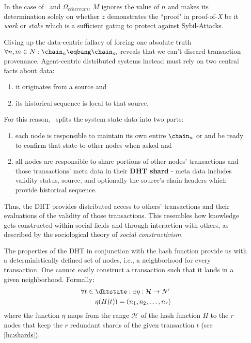 \documentclass[twocolumn,showpacs,%
  nofootinbib,aps,superscriptaddress,%
  eqsecnum,prd,notitlepage,showkeys,10pt]{revtex4-1}
\begin{document}
In the case of \sbtc\ and $\Omega_{ethereum}$, $M$ ignores the value of $n$ and makes its determination solely on whether $z$ demonstrates the ``proof" in proof-of-\textit{X} be it \textit{work} or \textit{stake} which is a sufficient gating to protect against Sybil-Attacks.

Giving up the data-centric fallacy of forcing one absolute truth $\forall n,m \in N: \chain_n\eqbang\chain_m$ reveals that we can't discard transaction provenance.
Agent-centric distributed systems instead must rely on two central facts about data:
\begin{enumerate}
\item it originates from a source and
\item its historical sequence is local to that source.
\end{enumerate}
For this reason, \shc\ splits the system state data into two parts:
\begin{enumerate}
\item each node is responsible to maintain its own entire $\chain_n$ or  and be ready to confirm that state to other nodes when asked and
\item all nodes are responsible to share portions of other nodes' transactions and those transactions' meta data in their \textbf{DHT shard} - meta data includes validity status, source, and optionally the source's chain headers which provide historical sequence.
\end{enumerate}

Thus, the DHT provides distributed access to others' transactions and their evaluations of the validity of those transactions.
This resembles how knowledge gets constructed within social fields and through interaction with others, as described by the sociological theory of \textit{social constructivism}.

The properties of the DHT in conjunction with the hash function provide us with a
deterministically defined set of nodes, i.e., a neighborhood for every transaction.
One cannot easily construct a transaction such that it lands in a given neighborhood.
Formally:
\begin{equation}
\begin{split}
\forall t\in\dhtstate: \exists \eta: \mathcal{H}\rightarrow N^r\\
\eta(H(t))=(n_1, n_2, \dots, n_r)
\end{split}
\end{equation}
where the function $\eta$ maps from the range $\mathcal{H}$ of the hash function $H$
to the $r$ nodes that keep the $r$ redundant shards of the given transaction $t$ (see \ref{hc:shards}).
\end{document}
